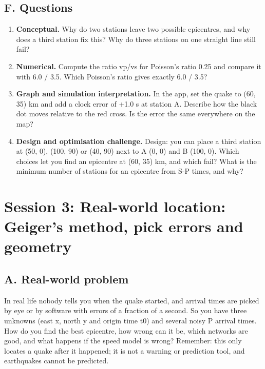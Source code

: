 \documentclass[11pt,a4paper]{article}
\begin{document}
\subsection*{F. Questions}
\begin{enumerate}[nosep]
\item \textbf{Conceptual.} Why do two stations leave two possible epicentres, and why does a third station fix this? Why do three stations on one straight line still fail?
\item \textbf{Numerical.} Compute the ratio vp/vs for Poisson's ratio 0.25 and compare it with 6.0 / 3.5. Which Poisson's ratio gives exactly 6.0 / 3.5?
\item \textbf{Graph and simulation interpretation.} In the app, set the quake to (60, 35) km and add a clock error of +1.0 s at station A. Describe how the black dot moves relative to the red cross. Is the error the same everywhere on the map?
\item \textbf{Design and optimisation challenge.} Design: you can place a third station at (50, 0), (100, 90) or (40, 90) next to A (0, 0) and B (100, 0). Which choices let you find an epicentre at (60, 35) km, and which fail? What is the minimum number of stations for an epicentre from S-P times, and why?
\end{enumerate}

\section{Session 3: Real-world location: Geiger's method, pick errors and geometry}

\subsection*{A. Real-world problem}
In real life nobody tells you when the quake started, and arrival times are picked by eye or by software with errors of a fraction of a second. So you have three unknowns (east x, north y and origin time t0) and several noisy P arrival times. How do you find the best epicentre, how wrong can it be, which networks are good, and what happens if the speed model is wrong? Remember: this only locates a quake after it happened; it is not a warning or prediction tool, and earthquakes cannot be predicted.
\end{document}
